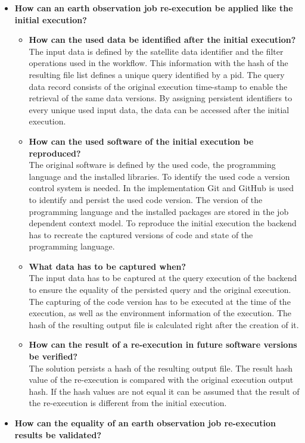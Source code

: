 \documentclass[draft,final]{vutinfth} %
\begin{document}
\begin{itemize}
	\item \textbf{How can an earth observation job re-execution be applied like the initial execution?}
	\begin{itemize}
		\item \textbf{How can the used data be identified after the initial execution?} \\
		The input data is defined by the satellite data identifier and the filter operations used in the workflow. This information with the hash of the resulting file list defines a unique query identified by a pid. The query data record consists of the original execution time-stamp to enable the retrieval of the same data versions. By assigning persistent identifiers to every unique used input data, the data can be accessed after the initial execution.    
		\item \textbf{How can the used software of the initial execution be reproduced?} \\
		The original software is defined by the used code, the programming language and the installed libraries. To identify the used code a version control system is needed. In the implementation Git and GitHub is used to identify and persist the used code version. The version of the programming language and the installed packages are stored in the job dependent context model. To reproduce the initial execution the backend has to recreate the captured versions of code and state of the programming language.       
		\item \textbf{What data has to be captured when?} \\
		The input data has to be captured at the query execution of the backend to ensure the equality of the persisted query and the original execution. The capturing of the code version has to be executed at the time of the execution, as well as the environment information of the execution. The hash of the resulting output file is calculated right after the creation of it.  
		\item \textbf{How can the result of a re-execution in future software versions be verified?} \\
		The solution persists a hash of the resulting output file. The result hash value of the re-execution is compared with the original execution output hash. If the hash values are not equal it can be assumed that the result of the re-execution is different from the initial execution. 
	\end{itemize}
	\item \textbf{How can the equality of an earth observation job re-execution results be validated?}

\end{itemize}
\end{document}
